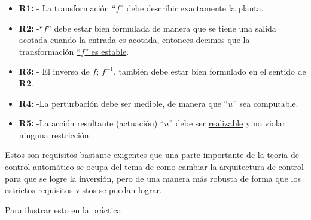 \documentclass[a4paper]{article}
\begin{document}
\begin{itemize}
		\item \textbf{R1:} - La transformación ``$f$'' debe describir exactamente la planta.
		\item \textbf{R2:} -``$f$'' debe estar bien formulada de manera que se tiene una salida acotada cuando la entrada es acotada, entonces decimos que la transformación \underline{``$f$'' es estable}.
		\item \textbf{R3:} - El inverso de $f$; $f^{-1}$, también debe estar bien formulado en el sentido de \textbf{R2}.
		\item \textbf{R4:} -La perturbación debe ser medible, de manera que ``$u$'' sea computable.
		\item \textbf{R5:} -La acción resultante (actuación) ``$u$'' debe ser \underline{realizable} y no violar ninguna restricción.
\end{itemize}

Estos son requisitos bastante exigentes que una parte importante de la teoría de control automático se ocupa del tema de como cambiar la arquitectura de control para que se logre la inversión, pero de una manera más robusta de forma que los estrictos requisitos vistos se puedan lograr.

Para ilustrar esto en la práctica
\end{document}
